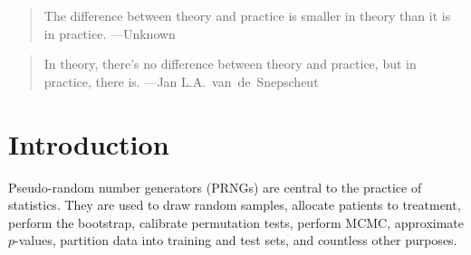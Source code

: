 \documentclass[graybox]{svmult}
\begin{document}
\begin{quotation}
The difference between theory and practice is smaller in theory than it is in practice. ---Unknown
\end{quotation}


\begin{quotation}
In theory, there's no difference between theory and practice, but in practice, there is. ---Jan L.A.~van~de~Snepscheut
\end{quotation}

\section{Introduction}
\label{sec:introduction}

%
%
%

Pseudo-random number generators (PRNGs) are central to the practice of statistics.
They are used to draw random samples, allocate patients to treatment, perform the bootstrap, 
calibrate permutation tests, perform MCMC, approximate $p$-values, partition data into training and test sets, and countless other purposes.
\end{document}
